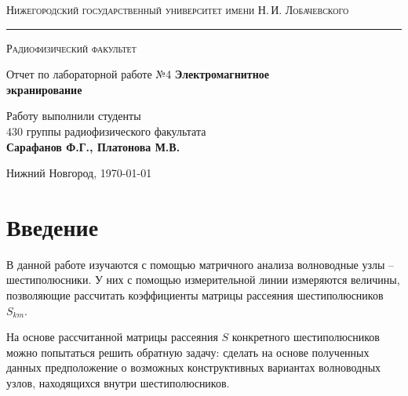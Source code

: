 \documentclass[a4paper,12pt]{article}
\def\labauthor{Сарафанов Ф.Г., Платонова М.В.}
\def\labnumber{4}
\def\labtheme{Электромагнитное \\[0.4em] экранирование}
\begin{document}
\begin{titlepage}

\begin{center}

{\textsc{Нижегородский государственный университет имени Н.\,И. Лобачевского}}
\vskip 2pt \hrule \vskip 3pt
{\textsc{Радиофизический факультет}}

\vfill


{{\LARGE Отчет по лабораторной работе №\labnumber}\vskip 12pt {\Huge \bfseries \labtheme}}

	
\vspace{2cm}
{\large Работу выполнили студенты \\[-0.25em] 430 группы радиофизического факультата \\[0.5em] {\Large \bfseries \labauthor}}



\end{center}

\vfill
	
	
	
\begin{center}
	{Нижний Новгород, \today}
\end{center}

\end{titlepage}

\tableofcontents
\newpage

\section*{Введение}
\label{sec:input}

В данной работе изучаются с помощью матричного анализа волноводные узлы -- шестиполюсники. У них с помощью измерительной линии измеряются величины, позволяющие рассчитать коэффициенты матрицы рассеяния шестиполюсников $S_{km}$. 

На основе рассчитанной матрицы рассеяния $S$ конкретного шестиполюсников можно попытаться решить обратную задачу: сделать на основе полученных данных предположение о возможных конструктивных вариантах волноводных узлов, находящихся внутри шестиполюсников.
\end{document}
